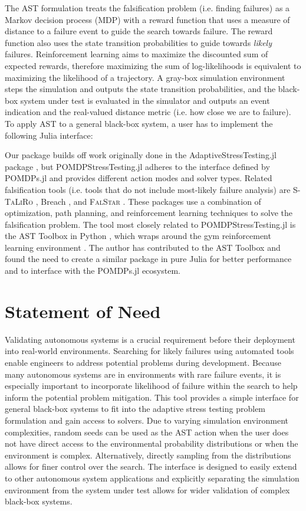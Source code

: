 The AST formulation treats the falsification problem (i.e. finding failures) as a Markov decision process (MDP) with a reward function that uses a measure of distance to a failure event to guide the search towards failure.
The reward function also uses the state transition probabilities to guide towards \textit{likely} failures.
Reinforcement learning aims to maximize the discounted sum of expected rewards, therefore maximizing the sum of log-likelihoods is equivalent to maximizing the likelihood of a trajectory.
A gray-box simulation environment steps the simulation and outputs the state transition probabilities, and the black-box system under test is evaluated in the simulator and outputs an event indication and the real-valued distance metric (i.e. how close we are to failure).
To apply AST to a general black-box system, a user has to implement the following Julia interface:


Our package builds off work originally done in the AdaptiveStressTesting.jl package \cite{ast}, but POMDPStressTesting.jl adheres to the interface defined by POMDPs.jl and provides different action modes and solver types.
Related falsification tools (i.e. tools that do not include most-likely failure analysis) are \textsc{S-TaLiRo} \cite{staliro}, Breach \cite{breach}, and \textsc{FalStar} \cite{falstar}.
These packages use a combination of optimization, path planning, and reinforcement learning techniques to solve the falsification problem.
The tool most closely related to POMDPStressTesting.jl is the AST Toolbox in Python \cite{ast_av}, which wraps around the gym reinforcement learning environment \cite{gym}.
The author has contributed to the AST Toolbox and found the need to create a similar package in pure Julia for better performance and to interface with the POMDPs.jl ecosystem.


\section{Statement of Need}

Validating autonomous systems is a crucial requirement before their deployment into real-world environments.
Searching for likely failures using automated tools enable engineers to address potential problems during development.
Because many autonomous systems are in environments with rare failure events, it is especially important to incorporate likelihood of failure within the search to help inform the potential problem mitigation.
This tool provides a simple interface for general black-box systems to fit into the adaptive stress testing problem formulation and gain access to solvers.
Due to varying simulation environment complexities, random seeds can be used as the AST action when the user does not have direct access to the environmental probability distributions or when the environment is complex.
Alternatively, directly sampling from the distributions allows for finer control over the search.
The interface is designed to easily extend to other autonomous system applications and explicitly separating the simulation environment from the system under test allows for wider validation of complex black-box systems.



